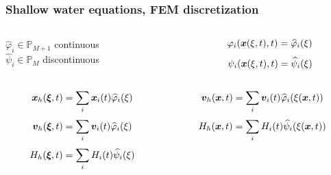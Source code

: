 \documentclass[pt12]{beamer}
\newcommand{\uvec}[2][3]{\boldsymbol{#2\mkern-#1mu}\mkern#1mu}
\newcommand{\hphi}[0]{\widehat{\varphi}}
\newcommand{\hpsi}[0]{\widehat{\psi}}
\begin{document}
\begin{frame}
\frametitle{Shallow water equations, FEM discretization}

    \begin{columns}

        \begin{column}{0.50\textwidth}
\quad $\hphi_i\in \mathbb{P}_{M+1}$ continuous\\
\quad $\hpsi_i\in \mathbb{P}_{M}$ \quad discontinuous
        \end{column}
        \begin{column}{0.50\textwidth}
$$\varphi_i(\uvec{x}(\xi,t),t)=\hphi_i(\xi)$$
$$\psi_i(\uvec{x}(\xi,t),t)=\hpsi_i(\xi)$$
        \end{column}
    \end{columns}

\vspace{1cm}

    \begin{columns}

        \begin{column}{0.50\textwidth}
$$\uvec{x}_h(\uvec{\xi},t)=\sum_i\uvec{x}_i(t)\hphi_i(\xi)$$
$$\uvec{v}_h(\uvec{\xi},t)=\sum_i\uvec{v}_i(t)\hphi_i(\xi)$$
$$H_h(\uvec{\xi},t)=\sum_i H_i(t)\hpsi_i(\xi)$$
        \end{column}
        \begin{column}{0.50\textwidth}
$$\uvec{v}_h(\uvec{x},t)=\sum_i\uvec{v}_i(t)\hphi_i(\xi(\uvec{x},t))$$
$$H_h(\uvec{x},t)=\sum_i H_i(t)\hpsi_i(\xi(\uvec{x},t))$$
        \end{column}
    \end{columns}


\end{frame}
\end{document}
